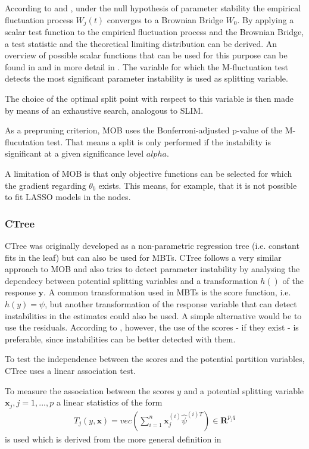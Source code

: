 According to \citep{Zeileis.2008} and \citep{Zeileis.2007}, under the null hypothesis of parameter stability the empirical fluctuation process $W_j(t)$ converges to a Brownian Bridge $W_0$. By applying a scalar test function to the empirical fluctuation process and the Brownian Bridge, a test statistic and the theoretical limiting distribution can be derived. An overview of possible scalar functions that can be used for this purpose can be found in \citep{Zeileis.2008} and in more detail in \citep{Zeileis.2007}.
The variable for which the M-fluctuation test detects the most significant parameter instability is used as splitting variable. 

The choice of the optimal split point with respect to this variable is then made by means of an exhaustive search, analogous to SLIM.

As a prepruning criterion, MOB uses the Bonferroni-adjusted p-value of the M-flucutation test. That means a split is only performed if the instability is significant at a given significance level $alpha$.


A limitation of MOB is that only objective functions can be selected for which the gradient regarding $\theta_b$  exists. This means, for example, that it is not possible to fit LASSO models in the nodes.



\subsubsection{CTree}
CTree was originally developed as a non-parametric regression tree (i.e. constant fits in the leaf) but can also be used for MBTs.
CTree follows a very similar approach to MOB and also tries to detect parameter instability by analysing the dependecy between potential splitting variables and a transformation $h()$ of the response $\textbf{y}$.
A common transformation used in MBTs is the score function, i.e. $h(y) = \psi$, but another transformation of the response variable that can detect instabilities in the estimates could also be used. A simple alternative would be to use the residuals. According to \citep{Schlosser.2019}, however, the use of the scores - if they exist - is preferable, since instabilities can be better detected with them.

To test the independence between the scores and the potential partition variables, CTree uses a linear association test.

To measure the association between the scores $y$ and a potential splitting variable $\textbf{x}_{j}, j = 1,...,p$ a linear statistics of the form 
\begin{align}
    T_{j}(y,\textbf{x}) = vec\left(\sum_{i=1}^n \textbf{x}_j^{(i)}\hat{\psi}^{(i)T}\right) \in \mathbf{R}^{p_{j} q}
\end{align}
is used which is derived from the more general definition in \citep{Hothorn.2006}

